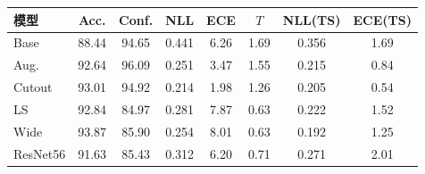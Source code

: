 \begin{tabular}{lccccccc}
\toprule
模型 & Acc. & Conf. & NLL & ECE & $T$ & NLL(TS) & ECE(TS) \\
\midrule
Base & 88.44 & 94.65 & 0.441 & 6.26 & 1.69 & 0.356 & 1.69 \\
Aug. & 92.64 & 96.09 & 0.251 & 3.47 & 1.55 & 0.215 & 0.84 \\
Cutout & 93.01 & 94.92 & 0.214 & 1.98 & 1.26 & 0.205 & 0.54 \\
LS & 92.84 & 84.97 & 0.281 & 7.87 & 0.63 & 0.222 & 1.52 \\
Wide & 93.87 & 85.90 & 0.254 & 8.01 & 0.63 & 0.192 & 1.25 \\
ResNet56 & 91.63 & 85.43 & 0.312 & 6.20 & 0.71 & 0.271 & 2.01 \\
\bottomrule
\end{tabular}
